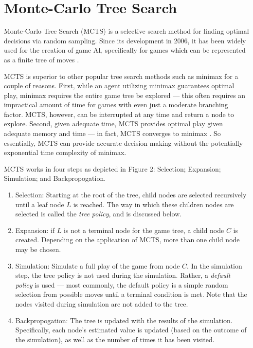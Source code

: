 \section{Monte-Carlo Tree Search}\label{sec:stateofart}
Monte-Carlo Tree Search (MCTS) is a selective search method for finding optimal decisions via random sampling. Since its development in 2006, it has been widely used for the creation of game AI, specifically for games which can be represented as a finite tree of moves \cite{browne2012survey}\cite{chaslot2008monte}.

MCTS is superior to other popular tree search methods such as minimax for a couple of reasons.  First, while an agent utilizing minimax guarantees optimal play, minimax requires the entire game tree be explored --- this often requires an impractical amount of time for games with even just a moderate branching factor.  MCTS, however, can be interrupted at any time and return a node to explore.  Second, given adequate time, MCTS provides optimal play given adequate memory and time --- in fact, MCTS converges to minimax \cite{browne2012survey}.  So essentially, MCTS can provide accurate decision making without the potentially exponential time complexity of minimax.  

MCTS works in four steps as depicted in Figure 2: Selection; Expansion; Simulation; and Backpropogation.
\begin{enumerate}
    \item  Selection: Starting at the root of the tree, child nodes are selected recursively until a leaf node $L$ is reached.  The way in which these children nodes are selected is called the \textit{tree policy}, and is discussed below.
    
    \item Expansion: if $L$ is not a terminal node for the game tree, a child node $C$ is created.  Depending on the application of MCTS, more than one child node may be chosen.
    
    \item Simulation: Simulate a full play of the game from node $C$.  In the simulation step, the tree policy is not used during the simulation.  Rather, a \textit{default policy} is used --- most commonly, the default policy is a simple random selection from possible moves until a terminal condition is met.  Note that the nodes visited during simulation are not added to the tree.
    
    \item Backpropogation: The tree is updated with the results of the simulation.  Specifically, each node's estimated value is updated (based on the outcome of the simulation), as well as the number of times it has been visited.
\end{enumerate}

